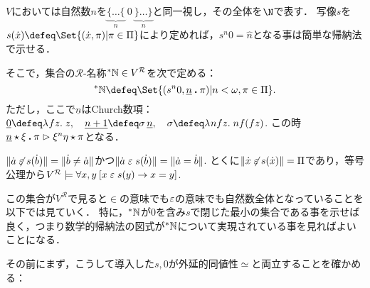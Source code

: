\documentclass[realisability.tex]{subfiles}
\begin{document}
\begin{definition}
 $V$においては自然数$n$を$\mathopen{\underbrace{\{\dots\{}_{n}}\  0\ \mathclose{\underbrace{\}\dots\}}_{n}}$と同一視し，その全体を$\N$で表す．
 写像$s$を$s(\dot{x}) \defeq \Set{ (\dot{x}, \pi) | \pi \in \Pi}$により定めれば，$s^n 0 = \widehat{n}$となる事は簡単な帰納法で示せる． 

 そこで，集合の$\mathcal{R}$-名称$\mathord{{}^{*}\mathbb{N}} \in V^{\mathcal{R}}$を次で定める：
 \[
  \NN \defeq \Set{ (s^n 0, \num{n} \push \pi) | n < \omega, \pi \in \Pi}.
 \]
 ただし，ここで$\underline{n}$はChurch数項：$\underline{0} \defeq \abs{f z}{z}, \quad \underline{n+1} \defeq \sigma \, \underline{n}, \quad \sigma \defeq \abs{n f z}{n f (f z)}$.
 この時$\underline{n} \mathbin{\star} \xi \mathbin{\boldsymbol{.}} \pi \mathrel{\rhd} \xi^n \eta \mathbin{\star} \pi$となる．
\end{definition}
\begin{remark}
 $\|\dot{a} \not\mathrel{\varepsilon} s(\dot{b})\| = \|\dot{b} \neq \dot{a}\|$かつ$\|\dot{a} \mathrel{\varepsilon} s(\dot{b})\| = \|\dot{a} = \dot{b}\|$.
 とくに$\|\dot{x} \not\mathrel{\varepsilon} s(\dot{x})\| = \Pi$であり，等号公理から$V^{\mathcal{R}} \models \forall x, y \: [x \mathrel{\varepsilon} s(y) \to x = y]$.
\end{remark}

この集合が$V^{\mathcal{R}}$で見ると$\in$の意味でも$\mathrel{\varepsilon}$の意味でも自然数全体となっていることを以下では見ていく．
特に，$\mathord{{}^{*}\mathbb{N}}$が$0$を含み$s$で閉じた最小の集合である事を示せば良く，つまり数学的帰納法の図式が$\mathord{{}^{*}\mathbb{N}}$について実現されている事を見ればよいことになる．

その前にまず，こうして導入した$s, 0$が外延的同値性$\simeq$と両立することを確かめる：
\end{document}
